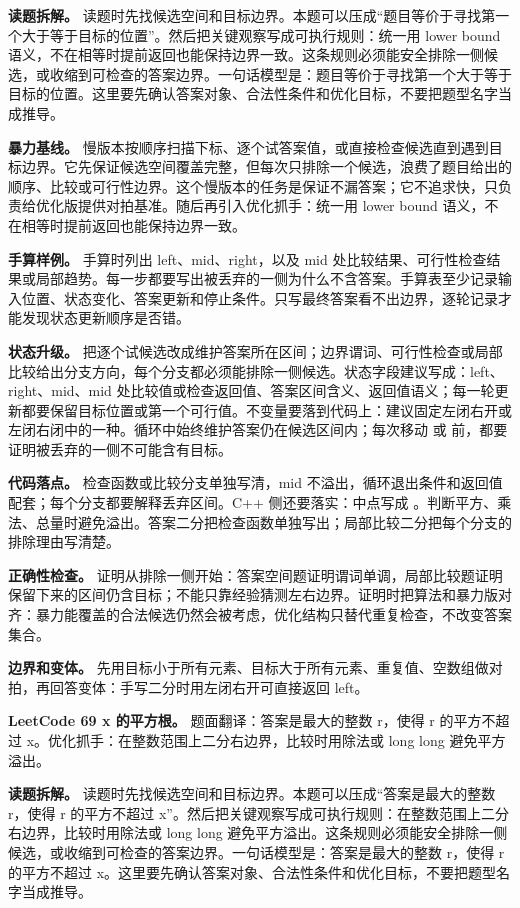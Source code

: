 \textbf{读题拆解。} 读题时先找候选空间和目标边界。本题可以压成“题目等价于寻找第一个大于等于目标的位置”。然后把关键观察写成可执行规则：统一用 lower bound 语义，不在相等时提前返回也能保持边界一致。这条规则必须能安全排除一侧候选，或收缩到可检查的答案边界。一句话模型是：题目等价于寻找第一个大于等于目标的位置。这里要先确认答案对象、合法性条件和优化目标，不要把题型名字当成推导。

\textbf{暴力基线。} 慢版本按顺序扫描下标、逐个试答案值，或直接检查候选直到遇到目标边界。它先保证候选空间覆盖完整，但每次只排除一个候选，浪费了题目给出的顺序、比较或可行性边界。这个慢版本的任务是保证不漏答案；它不追求快，只负责给优化版提供对拍基准。随后再引入优化抓手：统一用 lower bound 语义，不在相等时提前返回也能保持边界一致。

\textbf{手算样例。} 手算时列出 left、mid、right，以及 mid 处比较结果、可行性检查结果或局部趋势。每一步都要写出被丢弃的一侧为什么不含答案。手算表至少记录输入位置、状态变化、答案更新和停止条件。只写最终答案看不出边界，逐轮记录才能发现状态更新顺序是否错。

\textbf{状态升级。} 把逐个试候选改成维护答案所在区间；边界谓词、可行性检查或局部比较给出分支方向，每个分支都必须能排除一侧候选。状态字段建议写成：left、right、mid、mid 处比较值或检查返回值、答案区间含义、返回值语义；每一轮更新都要保留目标位置或第一个可行值。不变量要落到代码上：建议固定左闭右开或左闭右闭中的一种。循环中始终维护答案仍在候选区间内；每次移动  或  前，都要证明被丢弃的一侧不可能含有目标。

\textbf{代码落点。} 检查函数或比较分支单独写清，mid 不溢出，循环退出条件和返回值配套；每个分支都要解释丢弃区间。C++ 侧还要落实：中点写成 。判断平方、乘法、总量时避免溢出。答案二分把检查函数单独写出；局部比较二分把每个分支的排除理由写清楚。

\textbf{正确性检查。} 证明从排除一侧开始：答案空间题证明谓词单调，局部比较题证明保留下来的区间仍含目标；不能只靠经验猜测左右边界。证明时把算法和暴力版对齐：暴力能覆盖的合法候选仍然会被考虑，优化结构只替代重复检查，不改变答案集合。

\textbf{边界和变体。} 先用目标小于所有元素、目标大于所有元素、重复值、空数组做对拍，再回答变体：手写二分时用左闭右开可直接返回 left。

\noindent\textbf{LeetCode 69 x 的平方根。} 题面翻译：答案是最大的整数 r，使得 r 的平方不超过 x。优化抓手：在整数范围上二分右边界，比较时用除法或 long long 避免平方溢出。

\textbf{读题拆解。} 读题时先找候选空间和目标边界。本题可以压成“答案是最大的整数 r，使得 r 的平方不超过 x”。然后把关键观察写成可执行规则：在整数范围上二分右边界，比较时用除法或 long long 避免平方溢出。这条规则必须能安全排除一侧候选，或收缩到可检查的答案边界。一句话模型是：答案是最大的整数 r，使得 r 的平方不超过 x。这里要先确认答案对象、合法性条件和优化目标，不要把题型名字当成推导。

